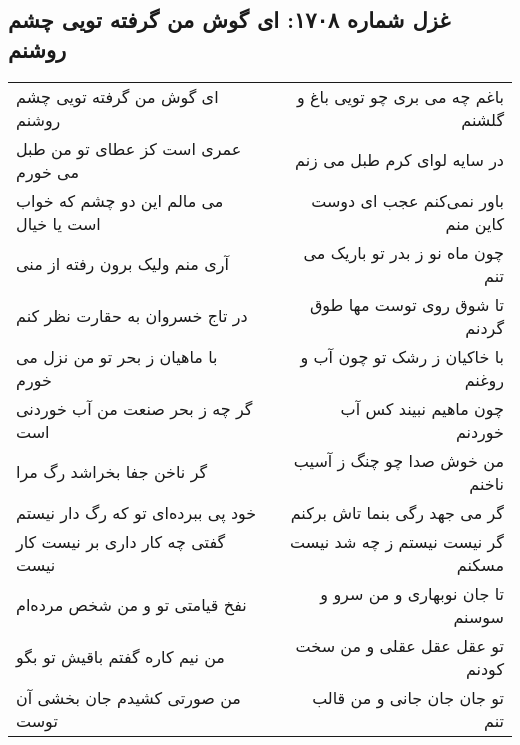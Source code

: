 \begin{center}
\section*{غزل شماره ۱۷۰۸: ای گوش من گرفته تویی چشم روشنم}
\label{sec:1708}
\begin{longtable}{l p{0.5cm} r}
ای گوش من گرفته تویی چشم روشنم
&&
باغم چه می بری چو تویی باغ و گلشنم
\\
عمری است کز عطای تو من طبل می خورم
&&
در سایه لوای کرم طبل می زنم
\\
می مالم این دو چشم که خواب است یا خیال
&&
باور نمی‌کنم عجب ای دوست کاین منم
\\
آری منم ولیک برون رفته از منی
&&
چون ماه نو ز بدر تو باریک می تنم
\\
در تاج خسروان به حقارت نظر کنم
&&
تا شوق روی توست مها طوق گردنم
\\
با ماهیان ز بحر تو من نزل می خورم
&&
با خاکیان ز رشک تو چون آب و روغنم
\\
گر چه ز بحر صنعت من آب خوردنی است
&&
چون ماهیم نبیند کس آب خوردنم
\\
گر ناخن جفا بخراشد رگ مرا
&&
من خوش صدا چو چنگ ز آسیب ناخنم
\\
خود پی ببرده‌ای تو که رگ دار نیستم
&&
گر می جهد رگی بنما تاش برکنم
\\
گفتی چه کار داری بر نیست کار نیست
&&
گر نیست نیستم ز چه شد نیست مسکنم
\\
نفخ قیامتی تو و من شخص مرده‌ام
&&
تا جان نوبهاری و من سرو و سوسنم
\\
من نیم کاره گفتم باقیش تو بگو
&&
تو عقل عقل عقلی و من سخت کودنم
\\
من صورتی کشیدم جان بخشی آن توست
&&
تو جان جان جانی و من قالب تنم
\\
\end{longtable}
\end{center}
